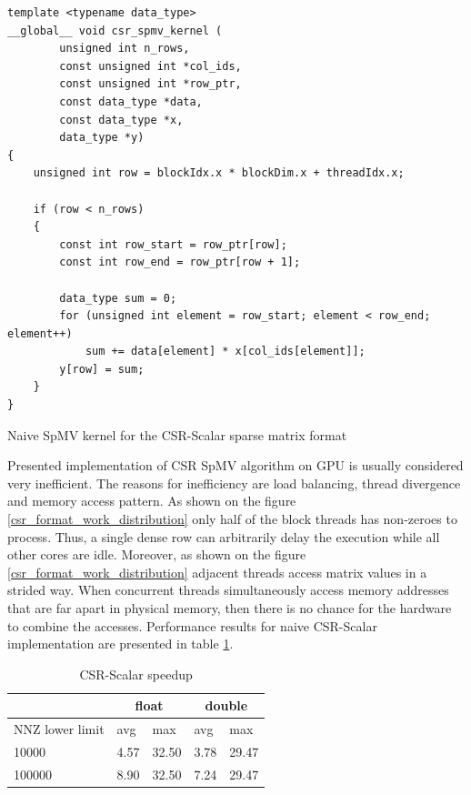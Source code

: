 \documentclass{article}
\begin{document}
\begin{listing}[H]
\begin{verbatim}
template <typename data_type>
__global__ void csr_spmv_kernel (
		unsigned int n_rows,
		const unsigned int *col_ids,
		const unsigned int *row_ptr,
		const data_type *data,
		const data_type *x,
		data_type *y)
{
	unsigned int row = blockIdx.x * blockDim.x + threadIdx.x;

	if (row < n_rows)
	{
		const int row_start = row_ptr[row];
		const int row_end = row_ptr[row + 1];

		data_type sum = 0;
		for (unsigned int element = row_start; element < row_end; element++)
			sum += data[element] * x[col_ids[element]];
		y[row] = sum;
	}
}
\end{verbatim}
\caption{Naive SpMV kernel for the CSR-Scalar sparse matrix format}
\label{csr_scalar}
\end{listing}

Presented implementation of CSR SpMV algorithm on GPU is usually considered very inefficient. The reasons for
inefficiency are load balancing, thread divergence and memory access pattern. As shown on the figure \ref{csr_format_work_distribution} only half
of the block threads has non-zeroes to process. Thus, a single dense row can arbitrarily delay the execution while all
other cores are idle. Moreover, as shown on the figure \ref{csr_format_work_distribution} adjacent threads access matrix values in a strided way. When concurrent threads simultaneously 
access memory addresses that are far apart in physical memory, then there is no chance for the hardware to combine the accesses. Performance
results for naive CSR-Scalar implementation are presented in table \ref{csr_scalar_speedup_table}. 

\begin{table}[H]
	\centering
	\begin{tabular}{ |p{2.6cm}||p{1cm}|p{1cm}|p{1cm}|p{1cm}|  }
	 \hline
		& \multicolumn{2}{|c|}{float} & \multicolumn{2}{|c|}{double}\\
	 \hline
	 NNZ lower limit & avg & max & avg & max  \\
	 \hline
	 10000  & 4.57 & 32.50 & 3.78 & 29.47 \\
	 100000 & 8.90 & 32.50 & 7.24 & 29.47 \\
	 \hline
	\end{tabular}
	\caption{CSR-Scalar speedup}
  \label{csr_scalar_speedup_table}
\end{table}
\end{document}
